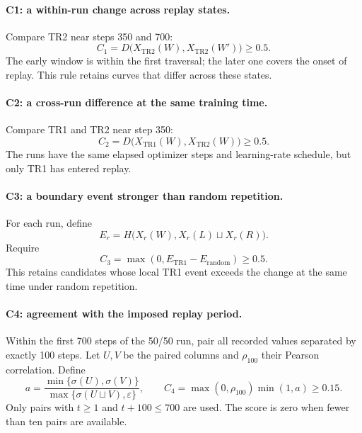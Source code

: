\paragraph{C1: a within-run change across replay states.}
Compare TR2 near steps 350 and 700:
\begin{equation}
 C_1=D\bigl(X_{\mathrm{TR2}}(W),X_{\mathrm{TR2}}(W')\bigr)\geq0.5.
\end{equation}
The early window is within the first traversal; the later one covers the onset of replay. This rule retains curves that differ across these states.

\paragraph{C2: a cross-run difference at the same training time.}
Compare TR1 and TR2 near step 350:
\begin{equation}
 C_2=D\bigl(X_{\mathrm{TR1}}(W),X_{\mathrm{TR2}}(W)\bigr)\geq0.5.
\end{equation}
The runs have the same elapsed optimizer steps and learning-rate schedule, but only TR1 has entered replay.

\paragraph{C3: a boundary event stronger than random repetition.}
For each run, define
\begin{equation}
 E_r=H\bigl(X_r(W),X_r(L)\sqcup X_r(R)\bigr).
\end{equation}
Require
\begin{equation}
 C_3=\max(0,E_{\mathrm{TR1}}-E_{\mathrm{random}})\geq0.5.
\end{equation}
This retains candidates whose local TR1 event exceeds the change at the same time under random repetition.

\paragraph{C4: agreement with the imposed replay period.}
Within the first 700 steps of the 50/50 run, pair all recorded values separated by exactly 100 steps. Let $U,V$ be the paired columns and $\rho_{100}$ their Pearson correlation. Define
\begin{equation}
 a=\frac{\min\{\sigma(U),\sigma(V)\}}
         {\max\{\sigma(U\sqcup V),\varepsilon\}},\qquad
 C_4=\max(0,\rho_{100})\min(1,a)\geq0.15.
\end{equation}
Only pairs with $t\geq1$ and $t+100\leq700$ are used. The score is zero when fewer than ten pairs are available.


